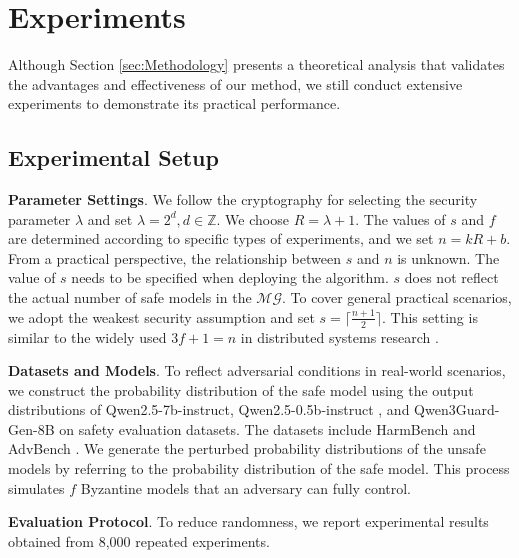 


\section{Experiments}
\label{sec:experiment}
Although Section \ref{sec:Methodology} presents a theoretical analysis that validates the advantages and effectiveness of our method, we still conduct extensive experiments to demonstrate its practical performance.



\subsection{Experimental Setup}
\noindent
\textbf{Parameter Settings}.
We follow the cryptography \citep{Ruan2025haw, Couteau2022sharp} for selecting the security parameter $\lambda$ and set
$\lambda = 2^d, d \in \mathbb{Z}.$ We choose $R = \lambda + 1$. The values of $s$ and $f$ are determined according to specific types of experiments, and we set $n = kR + b$. From a practical perspective, the relationship between $s$ and $n$ is unknown. The value of $s$ needs to be specified when deploying the algorithm. $s$ does not reflect the actual number of safe models in the $\mathcal{MG}$. To cover general practical scenarios, we adopt the weakest security assumption and set $s = \lceil \frac{n+1}{2} \rceil$. This setting is similar to the widely used $3f+1=n$ in distributed systems research \citep{zhang2023waterbear, Zhang2022pace}.



\noindent
\textbf{Datasets and Models}. 
To reflect adversarial conditions in real-world scenarios, we construct the probability distribution of the safe model using the output distributions of Qwen2.5-7b-instruct, Qwen2.5-0.5b-instruct \citep{qwen2025qwen25technicalreport}, and Qwen3Guard-Gen-8B \citep{zhao2025qwen3guard} on safety evaluation datasets. The datasets include HarmBench \citep{mazeika2024harmbench} and AdvBench \citep{zou2023universal}. We generate the perturbed probability distributions of the unsafe models by referring to the probability distribution of the safe model. This process simulates $f$ Byzantine models that an adversary can fully control. 

\noindent
\textbf{Evaluation Protocol}. To reduce randomness, we report experimental results obtained from 8,000 repeated experiments.



